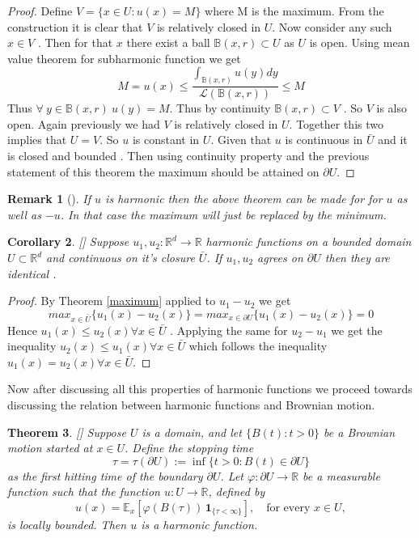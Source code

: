 \documentclass[11pt, a4paper, oneside]{report}
\numberwithin{equation}{section}
\newtheorem{theorem}{Theorem}[chapter]
\newtheorem{corollary}[theorem]{Corollary}
\newtheorem{remark}[theorem]{Remark}
\begin{document}
\begin{proof}
Define \(V =  \{x \in U : u(x)  = M\} \)  where M is the maximum. From the construction it is clear that \(V\) is relatively closed in \(U\). Now consider any such \(x \in V\) . Then for that \(x\) there exist a ball \( \mathbb{B}(x,r) \subset U\) as \(U \) is open. Using mean value theorem for subharmonic function we get \\
\[
M=u(x) \leq \frac{\int_{\mathbb{B}(x,r)} u(y)dy}{\mathscr{L}(\mathbb{B}(x,r))} \leq M
\]
Thus \( \forall\ y \in \mathbb{B}(x,r)\ u(y)=M\). Thus by continuity \(\mathbb{B}(x,r) \subset V\) . So \(V \) is also open. Again previously we had \(V\) is relatively closed in \(U\). Together this two implies that \(U=V\). So \(u\) is constant in \(U\).
\noindent Given that \(u\) is continuous in \(\bar{U}\) and it is closed and bounded . Then using continuity property and the previous statement of this theorem the maximum should be attained on \(\partial{U}\).
\end{proof}
\begin{remark}[{\cite[Remark 3.6]{PeresMortersBook}}]
If \(u\) is harmonic then the above theorem can be made for for \(u\) as well as \(-u\). In that case the maximum will just be replaced by the minimum.
\end{remark}
\begin{corollary}\label{unique}[{\cite[Corollary 3.7]{PeresMortersBook}}]
Suppose \( u_1,u_2 : \mathbb{R}^d \to \mathbb{R}\) harmonic functions on a bounded domain \(U \subset \mathbb{R}^d\) and continuous on it's closure \(\bar{U}\). If \(u_1,u_2\) agrees on \(\partial{U}\) then they are identical .
\end{corollary}
\begin{proof}
By Theorem \ref{maximum} applied to \(u_1 -u_2\) we get 
\[
max_{x\in \bar{U}}{\{u_1(x)-u_2(x)\}} = max_{x\in \partial{U}}{\{u_1(x)-u_2(x)\}} = 0 
\]
Hence \(u_1(x) \leq u_2(x) \forall x \in \bar{U}\) . Applying the same for \(u_2-u_1\) we get the inequality \(u_2(x) \leq u_1(x) \forall x \in \bar{U}\) which  follows the inequality \(u_1(x) = u_2(x) \forall x \in \bar{U}\).
\end{proof}
\noindent Now after discussing all this properties of harmonic functions we proceed towards discussing the relation between harmonic functions and Brownian motion.
\begin{theorem}\label{locally-bounded-harmonic-function}[{\cite[Theorem 3.8]{PeresMortersBook}}]
Suppose \( U \) is a domain, and let \( \{B(t): t > 0\} \) be a Brownian motion started at \( x \in U \). Define the stopping time
\[
\tau = \tau(\partial U) := \inf\{t > 0 : B(t) \in \partial U\}
\]
as the first hitting time of the boundary \( \partial U\). Let \( \varphi: \partial U \to \mathbb{R} \) be a measurable function such that the function \( u: U \to \mathbb{R} \), defined by
\[
u(x) = \mathbb{E}_x \left[ \varphi(B(\tau)) \, \mathbf{1}_{\{\tau < \infty\}} \right], \quad \text{for every } x \in U,
\]
is locally bounded. Then \( u \) is a harmonic function.

\end{theorem}
\end{document}
